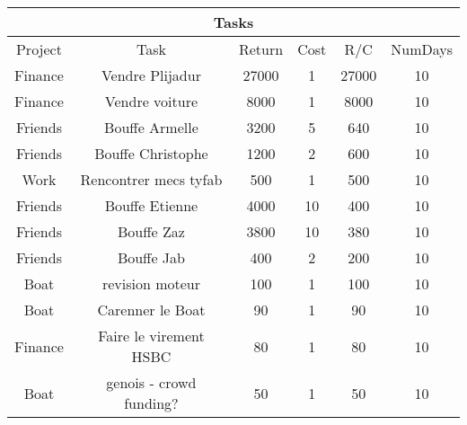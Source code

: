 \begin{longtable}{|c|c|c|c|c|c|}
\hline
\multicolumn{6}{|c|}{Tasks} \\
\hline
Project & Task & Return & Cost & R/C & NumDays \\
\hline
Finance & Vendre Plijadur & 27000 & 1 & 27000 & 10\\
\hline
Finance & Vendre voiture & 8000 & 1 & 8000 & 10\\
\hline
Friends & Bouffe Armelle & 3200 & 5 & 640 & 10\\
\hline
Friends & Bouffe Christophe & 1200 & 2 & 600 & 10\\
\hline
Work & Rencontrer mecs tyfab & 500 & 1 & 500 & 10\\
\hline
Friends & Bouffe Etienne & 4000 & 10 & 400 & 10\\
\hline
Friends & Bouffe Zaz & 3800 & 10 & 380 & 10\\
\hline
Friends & Bouffe Jab & 400 & 2 & 200 & 10\\
\hline
Boat & revision moteur & 100 & 1 & 100 & 10\\
\hline
Boat & Carenner le Boat & 90 & 1 & 90 & 10\\
\hline
Finance & Faire le virement HSBC & 80 & 1 & 80 & 10\\
\hline
Boat & genois - crowd funding? & 50 & 1 & 50 & 10\\
\hline
\end{longtable}
